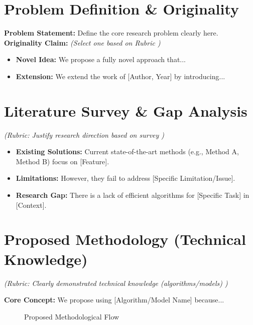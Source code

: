 \documentclass[11pt, a4paper]{article}
\begin{document}

\section{Problem Definition \& Originality}
\textbf{Problem Statement:} Define the core research problem clearly here. \\
\textbf{Originality Claim:} \textit{(Select one based on Rubric )}
\begin{itemize}[noitemsep, topsep=0pt]
    \item \textbf{Novel Idea:} We propose a fully novel approach that...
    \item \textbf{Extension:} We extend the work of [Author, Year] by introducing...
\end{itemize}

\section{Literature Survey \& Gap Analysis}
\textit{(Rubric: Justify research direction based on survey )}
\begin{itemize}[noitemsep, topsep=0pt]
    \item \textbf{Existing Solutions:} Current state-of-the-art methods (e.g., Method A, Method B) focus on [Feature].
    \item \textbf{Limitations:} However, they fail to address [Specific Limitation/Issue].
    \item \textbf{Research Gap:} There is a lack of efficient algorithms for [Specific Task] in [Context].
\end{itemize}

\section{Proposed Methodology (Technical Knowledge)}
\textit{(Rubric: Clearly demonstrated technical knowledge (algorithms/models) )}

\textbf{Core Concept:} We propose using [Algorithm/Model Name] because...

\begin{figure}[H]
    \centering
    \caption{Proposed Methodological Flow}
\end{figure}
\end{document}
